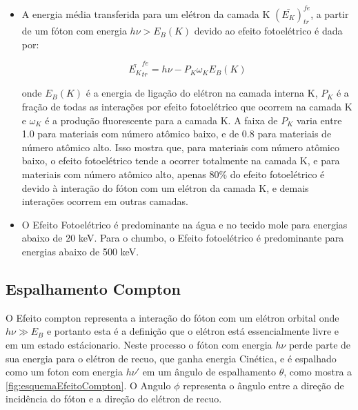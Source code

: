 \documentclass[11pt,a4paper]{article}
\begin{document}
            \begin{itemize}
                \item A energia média transferida para um elétron da camada K $(\bar{E_K})_{tr}^{fe}$, a partir de um fóton com energia $h \nu > E_B(K)$ devido ao efeito fotoelétrico é dada por:
                
                    \begin{equation}
                        \bar{E_K}_{tr}^{fe} = h\nu - P_K \omega_K E_B(K)
                    \end{equation}

                \noindent onde $E_B(K)$ é a energia de ligação do elétron na camada interna K, $P_K$ é a fração de todas as interações por efeito fotoelétrico que ocorrem na camada K e $\omega_K$ é a produção fluorescente para a camada K. A faixa de $P_K$ varia entre 1.0 para materiais com número atômico baixo, e de 0.8 para materiais de número atômico alto. Isso mostra que, para materiais com número atômico baixo, o efeito fotoelétrico tende a ocorrer totalmente na camada K, e para materiais com número atômico alto, apenas 80\% do efeito fotoelétrico é devido à interação do fóton com um elétron da camada K, e demais interações ocorrem em outras camadas. 

                \item O Efeito Fotoelétrico é predominante na água e no tecido mole para energias abaixo de 20 keV. Para o chumbo, o Efeito fotoelétrico é predominante para energias abaixo de 500 keV.
            \end{itemize}

        \subsection{Espalhamento Compton}

            O Efeito compton representa a interação do fóton com um elétron orbital onde  $h\nu \gg E_B $ e portanto esta é a definição que o elétron está essencialmente livre e em um estado estácionario. Neste processo o fóton com  energia $h\nu$ perde parte de sua energia para o elétron de recuo, que ganha energia Cinética, e é espalhado  como um  foton com energia $h\nu'$  em um ângulo de espalhamento $\theta$, como mostra a \ref{fig:esquemaEfeitoCompton}. O Angulo $\phi$ representa o ângulo entre a direção de incidência do fóton e a direção do elétron de recuo. 
\end{document}
